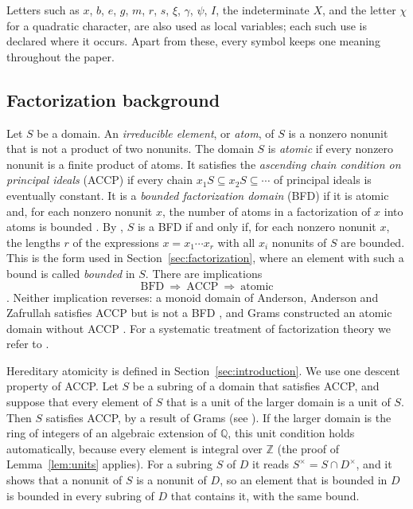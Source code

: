 \documentclass[11pt]{article}
\theoremstyle{plain}
\theoremstyle{definition}
\theoremstyle{remark}
\newcommand{\Z}{\mathbb Z}
\newcommand{\Q}{\mathbb Q}
\begin{document}
Letters such as $x$, $b$, $e$, $g$, $m$, $r$, $s$, $\xi$, $\gamma$, $\psi$, $I$,
the indeterminate $X$, and the letter $\chi$ for a quadratic character,
are also used as local variables; each such use is declared where it
occurs.  Apart from these, every symbol keeps one meaning throughout the
paper.

\subsection{Factorization background}\label{sec:factorization-background}

Let $S$ be a domain.  An \emph{irreducible element}, or \emph{atom}, of $S$
is a nonzero nonunit that is not a product of two nonunits.  The domain
$S$ is \emph{atomic} if every nonzero nonunit is a finite product of atoms.
It satisfies the \emph{ascending chain condition on principal ideals}
(ACCP) if every chain $x_1S\subseteq x_2S\subseteq\cdots$ of principal
ideals is eventually constant.  It is a \emph{bounded factorization
domain} (BFD) if it is atomic and, for each nonzero nonunit $x$, the
number of atoms in a factorization of $x$ into atoms is bounded
\cite[p.~1]{AAZ}.  By \cite[Theorem~2.4]{AAZ}, $S$ is a BFD if and only if,
for each nonzero nonunit $x$, the lengths $r$ of the expressions
$x=x_1\cdots x_r$ with all $x_i$ nonunits of $S$ are bounded.  This is the
form used in Section~\ref{sec:factorization}, where an
element with such a bound is called \emph{bounded} in $S$.  There are
implications
\[
 \text{BFD}\ \Longrightarrow\ \text{ACCP}\ \Longrightarrow\ \text{atomic}
\]
\cite[p.~2 and Section~2]{AAZ}.  Neither implication reverses: a monoid
domain of Anderson, Anderson and Zafrullah satisfies ACCP but is not a BFD
\cite[Example~2.1]{AAZ}, and Grams constructed an atomic domain without
ACCP \cite{Grams}.  For a systematic treatment of factorization theory we
refer to \cite{GHK}.

Hereditary atomicity is defined in Section~\ref{sec:introduction}.  We use
one descent property of ACCP.  Let $S$ be a subring of a domain that
satisfies ACCP, and suppose that every element of $S$ that is a unit of the
larger domain is a unit of $S$.  Then $S$ satisfies ACCP, by a result of
Grams (see \cite[Proposition~5.1]{CGH}).  If the larger domain is the ring of integers
of an algebraic extension of $\Q$, this unit condition holds automatically,
because every element is integral over $\Z$ (the proof of
Lemma~\ref{lem:units} applies).  For a subring $S$ of $D$ it reads
$S^\times=S\cap D^\times$, and it shows that a nonunit of $S$ is a nonunit
of $D$, so an element that is bounded in $D$
is bounded in every subring of $D$ that contains it, with the same bound.
\end{document}
